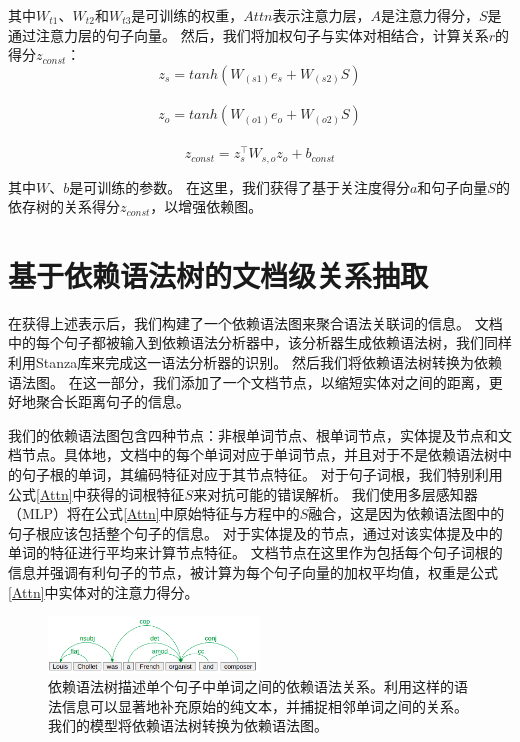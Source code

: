 \documentclass[bachelor]{thesis-uestc}
\begin{document}
其中$W_{t1}、W_{t2}$和$W_{t3}$是可训练的权重，$Attn$表示注意力层，$A$是注意力得分，$S$是通过注意力层的句子向量。
然后，我们将加权句子与实体对相结合，计算关系$r$的得分$z_{const}$：
\begin{equation}
    z_s = tanh(W_{(s1)}e_s+W_{(s2)}S)
\end{equation}
\\
\begin{equation}
    z_o = tanh(W_{(o1)}e_o+W_{(o2)}S)
\end{equation}
\\
\begin{equation}
    z_{const} = z_s^\top W_{s, o}z_o+b_{const}
\end{equation}

其中$W、b$是可训练的参数。
在这里，我们获得了基于关注度得分$a$和句子向量$S$的依存树的关系得分$z_{const}$，以增强依赖图。\par

\section{基于依赖语法树的文档级关系抽取}

在获得上述表示后，我们构建了一个依赖语法图来聚合语法关联词的信息。
文档中的每个句子都被输入到依赖语法分析器中，该分析器生成依赖语法树，我们同样利用Stanza库来完成这一语法分析器的识别。
然后我们将依赖语法树转换为依赖语法图。
在这一部分，我们添加了一个文档节点，以缩短实体对之间的距离，更好地聚合长距离句子的信息。\par

我们的依赖语法图包含四种节点：非根单词节点、根单词节点，实体提及节点和文档节点。具体地，文档中的每个单词对应于单词节点，并且对于不是依赖语法树中的句子根的单词，其编码特征对应于其节点特征。
对于句子词根，我们特别利用公式\ref{Attn}中获得的词根特征$S$来对抗可能的错误解析。
我们使用多层感知器（MLP）将在公式\ref{Attn}中原始特征与方程中的$S$融合，这是因为依赖语法图中的句子根应该包括整个句子的信息。
对于实体提及的节点，通过对该实体提及中的单词的特征进行平均来计算节点特征。
文档节点在这里作为包括每个句子词根的信息并强调有利句子的节点，被计算为每个句子向量的加权平均值，权重是公式\ref{Attn}中实体对的注意力得分。\par

\begin{figure}[t]
    \includegraphics[width=0.5\textwidth]{misc/dependency.png}
    \caption{依赖语法树描述单个句子中单词之间的依赖语法关系。利用这样的语法信息可以显著地补充原始的纯文本，并捕捉相邻单词之间的关系。我们的模型将依赖语法树转换为依赖语法图。} 
\end{figure}\label{fig_syn_a}
\end{document}
